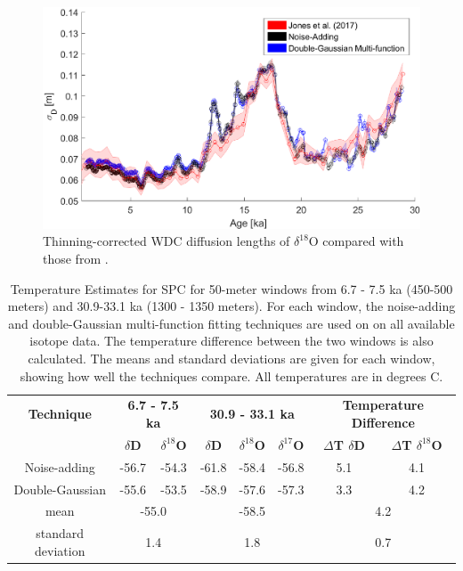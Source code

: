 \documentclass[draft, jgrga]{AGUTeX}
\begin{document}
\begin{figure}
	\includegraphics[width=.9\linewidth]{WAIS_diffusion_lengths_thinning_corr.eps}
	\caption{Thinning-corrected WDC diffusion lengths of $\delta^{18}$O compared with those from \cite{Jones2017a}.} \label{WAIS_diffusion_lengths_thinning_corr}
\end{figure}

\begin{table}
\caption{Temperature Estimates for SPC for 50-meter windows from 6.7 - 7.5 ka (450-500 meters) and 30.9-33.1 ka (1300 - 1350 meters). For each window, the noise-adding and double-Gaussian multi-function fitting techniques are used on on all available isotope data. The temperature difference between the two windows is also calculated. The means and standard deviations are given for each window, showing how well the techniques compare. All temperatures are in degrees C.}\label{SP_deltaT}
\begin{tabular}{c|c c|c c c|c c}
\textbf{Technique} & \multicolumn{2}{|c|}{\textbf{6.7 - 7.5 ka}} & \multicolumn{3}{|c|}{\textbf{30.9 - 33.1 ka}} & \multicolumn{2}{|c}{\textbf{Temperature Difference}}\\
 & \textbf{$\delta$D} & \textbf{$\delta^{18}$O} & \textbf{$\delta$D} & \textbf{$\delta^{18}$O} & \textbf{$\delta^{17}$O} & \textbf{$\Delta$T $\delta$D} & \textbf{$\Delta$T $\delta^{18}$O}\\
\hline
Noise-adding & -56.7 & -54.3 & -61.8 & -58.4 & -56.8 & 5.1 & 4.1 \\
Double-Gaussian & -55.6 & -53.5 & -58.9 & -57.6 & -57.3 & 3.3 & 4.2 \\
\hline
mean & \multicolumn{2}{|c|}{-55.0} & \multicolumn{3}{|c|}{-58.5} & \multicolumn{2}{|c}{4.2} \\
standard deviation & \multicolumn{2}{|c|}{1.4} & \multicolumn{3}{|c|}{1.8} & \multicolumn{2}{|c}{0.7} \\
\end{tabular}
\end{table}
\end{document}
